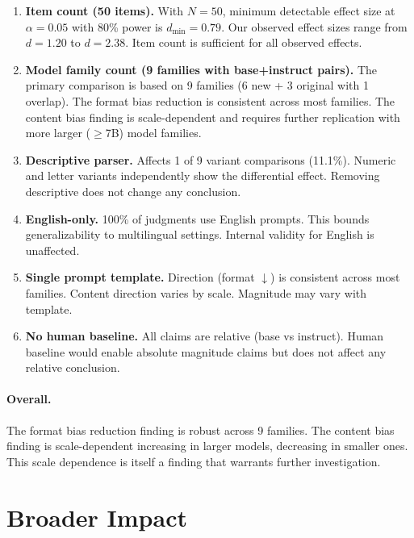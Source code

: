 \documentclass[11pt,twocolumn]{article}
\begin{document}
\begin{enumerate}
    \item \textbf{Item count (50 items).} With $N=50$, minimum detectable effect size at $\alpha=0.05$ with 80\% power is $d_{\min}=0.79$. Our observed effect sizes range from $d=1.20$ to $d=2.38$. Item count is sufficient for all observed effects.

    \item \textbf{Model family count (9 families with base+instruct pairs).} The primary comparison is based on 9 families (6 new + 3 original with 1 overlap). The format bias reduction is consistent across most families. The content bias finding is scale-dependent and requires further replication with more larger ($\geq$7B) model families.

    \item \textbf{Descriptive parser.} Affects 1 of 9 variant comparisons (11.1\%). Numeric and letter variants independently show the differential effect. Removing descriptive does not change any conclusion.

    \item \textbf{English-only.} 100\% of judgments use English prompts. This bounds generalizability to multilingual settings. Internal validity for English is unaffected.

    \item \textbf{Single prompt template.} Direction (format $\downarrow$) is consistent across most families. Content direction varies by scale. Magnitude may vary with template.

    \item \textbf{No human baseline.} All claims are relative (base vs instruct). Human baseline would enable absolute magnitude claims but does not affect any relative conclusion.
\end{enumerate}

\paragraph{Overall.} The format bias reduction finding is robust across 9 families. The content bias finding is scale-dependent  increasing in larger models, decreasing in smaller ones. This scale dependence is itself a finding that warrants further investigation.

\section{Broader Impact}
\end{document}
